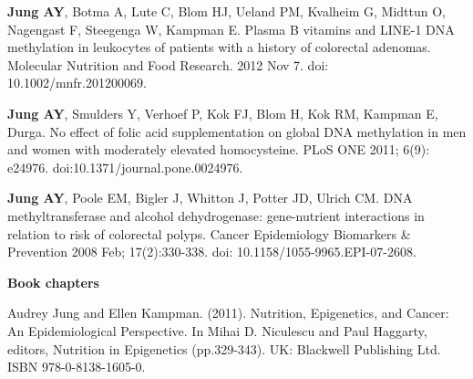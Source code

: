 \noindent \textbf{Jung AY}, Botma A, Lute C, Blom HJ, Ueland PM, Kvalheim G, Midttun O, Nagengast F, Steegenga W, Kampman E. Plasma B vitamins and LINE-1 DNA methylation in leukocytes of patients with a history of colorectal adenomas. Molecular Nutrition and Food Research. 2012 Nov 7. doi: 10.1002/mnfr.201200069.

\noindent \textbf{Jung AY}, Smulders Y, Verhoef P, Kok FJ, Blom H, Kok RM, Kampman E, Durga. No effect of folic acid supplementation on global DNA methylation in men and women with moderately elevated homocysteine. PLoS ONE 2011; 6(9): e24976. doi:10.1371/journal.pone.0024976.

\noindent \textbf{Jung AY}, Poole EM, Bigler J, Whitton J, Potter JD, Ulrich CM. DNA methyltransferase and alcohol dehydrogenase: gene-nutrient interactions in relation to risk of colorectal polyps. Cancer Epidemiology Biomarkers \& Prevention 2008 Feb; 17(2):330-338. doi: 10.1158/1055-9965.EPI-07-2608.

\noindent \textbf{Book chapters}

\noindent Audrey Jung and Ellen Kampman. (2011). Nutrition, Epigenetics, and Cancer: An Epidemiological Perspective. In Mihai D. Niculescu and Paul Haggarty, editors, Nutrition in Epigenetics (pp.329-343). UK: Blackwell Publishing Ltd. ISBN 978-0-8138-1605-0.
